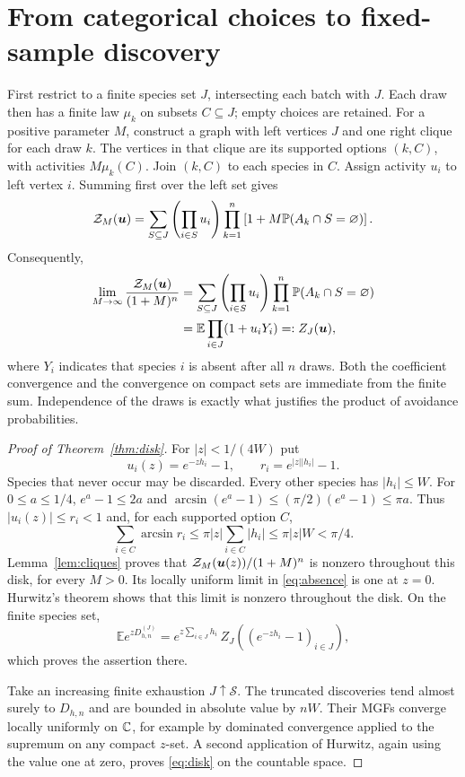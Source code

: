 \documentclass[11pt]{article}
\numberwithin{equation}{section}
\theoremstyle{remark}\newtheorem{remark}[theorem]{Remark}
\newcommand{\E}{\mathbb E}\newcommand{\Pp}{\mathbb P}
\begin{document}
\section{From categorical choices to fixed-sample discovery}
\label{sec:representation}
First restrict to a finite species set $J$, intersecting each batch with
$J$. Each draw then has a finite law $\mu_k$ on subsets $C\subseteq J$;
empty choices are retained. For a positive parameter $M$, construct a
graph with left vertices $J$ and one right clique for each draw $k$.
The vertices in that clique are its supported options $(k,C)$, with
activities $M\mu_k(C)$. Join $(k,C)$ to each species in $C$. Assign
activity $u_i$ to left vertex $i$. Summing first over the left set gives
\begin{equation}\label{eq:finiteM}
 \calZ_M(\boldsymbol u)
 =\sum_{S\subseteq J}\left(\prod_{i\in S}u_i\right)
    \prod_{k=1}^n\left[1+M\Pp(A_k\cap S=\varnothing)\right].
\end{equation}
Consequently,
\begin{align}
 \lim_{M\to\infty}\frac{\calZ_M(\boldsymbol u)}{(1+M)^n}
 &=\sum_{S\subseteq J}\left(\prod_{i\in S}u_i\right)
           \prod_{k=1}^n\Pp(A_k\cap S=\varnothing)\notag\\
 &=\E\prod_{i\in J}(1+u_iY_i)=:Z_J(\boldsymbol u),
 \label{eq:absence}
\end{align}
where $Y_i$ indicates that species $i$ is absent after all $n$ draws.
Both the coefficient convergence and the convergence on compact sets
are immediate from the finite sum. Independence of the draws is exactly
what justifies the product of avoidance probabilities.

\begin{proof}[Proof of Theorem~\ref{thm:disk}]
For $|z|<1/(4W)$ put
\[
 u_i(z)=e^{-zh_i}-1,\qquad r_i=e^{|z||h_i|}-1.
\]
Species that never occur may be discarded. Every other species has
$|h_i|\le W$. For $0\le a\le1/4$,
$e^a-1\le2a$ and $\arcsin(e^a-1)\le(\pi/2)(e^a-1)\le\pi a$.
Thus $|u_i(z)|\le r_i<1$ and, for each supported option $C$,
\[
 \sum_{i\in C}\arcsin r_i
 \le\pi|z|\sum_{i\in C}|h_i|
 \le\pi|z|W<\pi/4.
\]
Lemma~\ref{lem:cliques} proves that
$\mathcal Z_M(\boldsymbol u(z))/(1+M)^n$ is nonzero throughout this disk,
for every $M>0$. Its locally uniform limit in \eqref{eq:absence} is
one at $z=0$. Hurwitz's theorem shows that this limit is nonzero throughout
the disk. On the finite species set,
\[
 \E e^{zD_{h,n}^{(J)}}
   =e^{z\sum_{i\in J}h_i}\,Z_J((e^{-zh_i}-1)_{i\in J}),
\]
which proves the assertion there.

Take an increasing finite exhaustion $J\uparrow\mathcal S$.
The truncated discoveries tend almost surely to $D_{h,n}$ and are
bounded in absolute value by $nW$. Their MGFs converge locally uniformly
on $\mathbb C$, for example by dominated convergence applied to the supremum
on any compact $z$-set. A second application of Hurwitz, again using
the value one at zero, proves \eqref{eq:disk} on the countable space.
\end{proof}
\end{document}
